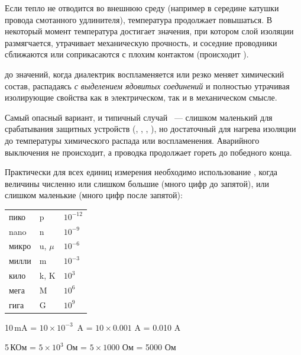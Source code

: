 Если тепло не отводится во внешнюю среду (например в середине катушки провода
смотанного удлинителя), температура продолжает повышаться. В некоторый момент
температура достигает значения, при котором слой изоляции размягчается,
утрачивает механическую прочность, и соседние проводники сближаются или
соприкасаются с плохим контактом (происходит ).

до значений, когда диалектрик воспламеняется или резко меняет химический состав,
распадаясь \emph{с выделением ядовитых соединений} и полностью утрачивая
изолирующие свойства как в электрическом, так и в механическом смысле.

Самый опасный вариант, и типичный случай \ --- 
слишком маленький для срабатывания защитных устройств
(, ,
, ), но достаточный для нагрева изоляции до
температуры химического распада или воспламенения. Аварийного выключения не
происходит, а проводка продолжает гореть до победного конца. 


Практически для всех единиц измерения необходимо использование
, когда величины численно
или слишком большие (много цифр до запятой), или слишком маленькие (много цифр
после запятой):

\bigskip
\begin{tabular}{ l l l }
пико & p & $10^{-12}$ \\
nano & n & $10^{-9}$ \\ 
микро & u, $\mu$ & $10^{-6}$ \\ 
милли & m & $10^{-3}$ \\
\hline
кило & k, K & $10^{3}$ \\
мега & M & $10^{6}$ \\
гига & G & $10^{9}$ \\
\end{tabular}
\bigskip

10\,mA = $10 \times 10^{-3}$\ A = $10 \times 0.001$ A = 0.010 A

5\,КОм = $5 \times 10^{3}$ Ом = $5 \times 1000$ Ом = 5000 Ом 

